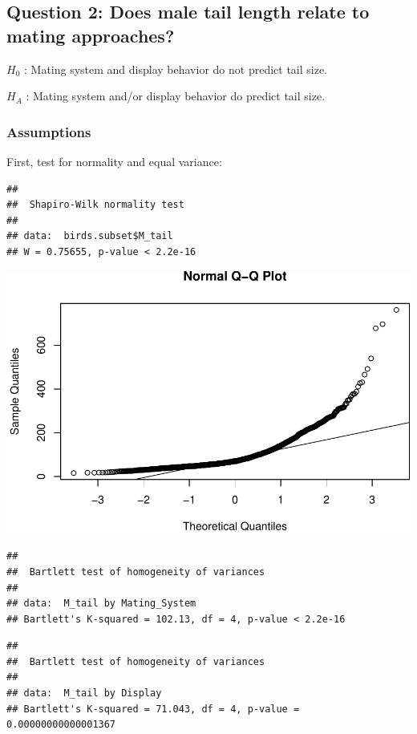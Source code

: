 \documentclass[
  12pt,
]{article}
\begin{document}
\newpage

\hypertarget{question-2-does-male-tail-length-relate-to-mating-approaches}{%
\subsection{Question 2: Does male tail length relate to mating
approaches?}\label{question-2-does-male-tail-length-relate-to-mating-approaches}}

\(H_0\) : Mating system and display behavior do not predict tail size.

\(H_A\) : Mating system and/or display behavior do predict tail size.

\hypertarget{assumptions-1}{%
\subsubsection{Assumptions}\label{assumptions-1}}

First, test for normality and equal variance:

\begin{verbatim}
## 
##  Shapiro-Wilk normality test
## 
## data:  birds.subset$M_tail
## W = 0.75655, p-value < 2.2e-16
\end{verbatim}

\includegraphics{Project_Code_files/figure-latex/question_2_part_1-1.pdf}

\begin{verbatim}
## 
##  Bartlett test of homogeneity of variances
## 
## data:  M_tail by Mating_System
## Bartlett's K-squared = 102.13, df = 4, p-value < 2.2e-16
\end{verbatim}

\begin{verbatim}
## 
##  Bartlett test of homogeneity of variances
## 
## data:  M_tail by Display
## Bartlett's K-squared = 71.043, df = 4, p-value = 0.00000000000001367
\end{verbatim}
\end{document}
